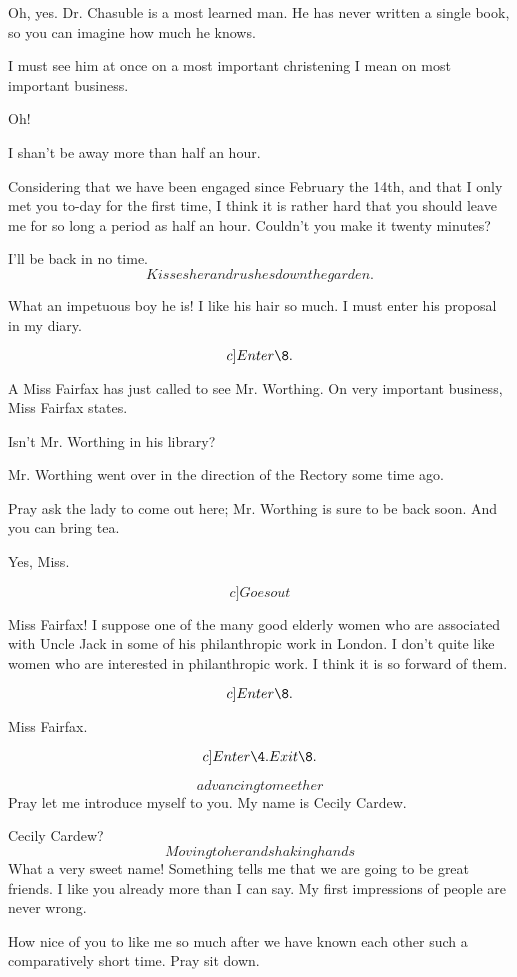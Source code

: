 \documentclass{book}
\begin{document}
\5  Oh, yes.  Dr. Chasuble is a most learned man.  He has
never written a single book, so you can imagine how much he knows.

\2  I must see him at once on a most important christening
\textemdash I mean on most important business.

\5  Oh!

\2  I shan't be away more than half an hour.

\5  Considering that we have been engaged since February the
14th, and that I only met you to-day for the first time, I think it
is rather hard that you should leave me for so long a period as
half an hour.  Couldn't you make it twenty minutes?

\2  I'll be back in no time. \[Kisses her and rushes down the garden.\]

\5  What an impetuous boy he is!  I like his hair so much.  I
must enter his proposal in my diary.

\[c]Enter \8.\]

\8  A Miss Fairfax has just called to see Mr. Worthing.  On
very important business, Miss Fairfax states.

\5  Isn't Mr. Worthing in his library?

\8  Mr. Worthing went over in the direction of the Rectory
some time ago.

\5  Pray ask the lady to come out here; Mr. Worthing is sure
to be back soon.  And you can bring tea.

\8  Yes, Miss.  

\[c]Goes out\]

\5  Miss Fairfax!  I suppose one of the many good elderly
women who are associated with Uncle Jack in some of his
philanthropic work in London.  I don't quite like women who are
interested in philanthropic work.  I think it is so forward of
them.

\[c]Enter \8.\]

\8  Miss Fairfax.

\[c]Enter \4. Exit \8.\]

\5  \[advancing to meet her\]  Pray let me introduce myself to
you.  My name is Cecily Cardew.

\7 Cecily Cardew?  \[Moving to her and shaking hands\]
What a very sweet name!  Something tells me that we are going to be
great friends.  I like you already more than I can say.  My first
impressions of people are never wrong.

\5  How nice of you to like me so much after we have known
each other such a comparatively short time.  Pray sit down.
\end{document}
